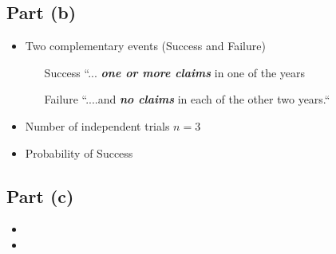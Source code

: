 \documentclass[a4paper,12pt]{article}
\begin{document}
\subsection*{Part (b)}
\begin{itemize}
\item Two complementary events (Success and Failure)
\begin{itemize}
\item[Success]  ``... \textbf{\textit{one or more
claims}} in one of the years
\item[Failure]  ``....and \textit{\textbf{no claims}} in each of the other two years.`` 
\end{itemize}
\item Number of independent trials $n=3$
\item Probability of Success
\end{itemize}



\subsection*{Part (c)}

\begin{itemize}
\item
\item
\end{itemize}

\end{document}
